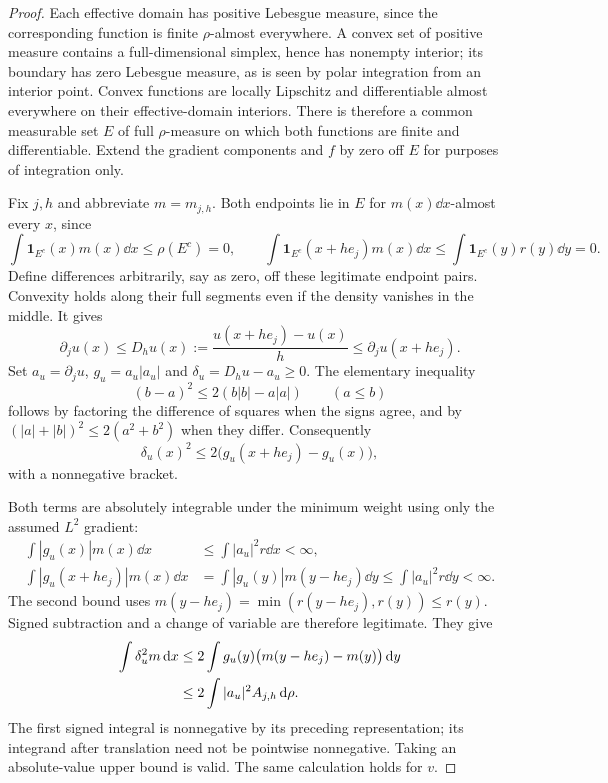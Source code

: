 \documentclass[11pt]{article}
\numberwithin{equation}{section}
\theoremstyle{remark}\newtheorem{remark}[theorem]{Remark}
\newcommand{\ind}{\mathbf 1}\newcommand{\norm}[1]{\left\lVert#1\right\rVert}
\begin{document}
\begin{proof}
Each effective domain has positive Lebesgue measure, since the corresponding function is finite $\rho$-almost everywhere. A convex set of positive measure contains a full-dimensional simplex, hence has nonempty interior; its boundary has zero Lebesgue measure, as is seen by polar integration from an interior point. Convex functions are locally Lipschitz and differentiable almost everywhere on their effective-domain interiors. There is therefore a common measurable set $E$ of full $\rho$-measure on which both functions are finite and differentiable. Extend the gradient components and $f$ by zero off $E$ for purposes of integration only.

Fix $j,h$ and abbreviate $m=m_{j,h}$. Both endpoints lie in $E$ for $m(x)\dd x$-almost every $x$, since
\[
 \int\ind_{E^c}(x)m(x)\dd x\le\rho(E^c)=0,\qquad
 \int\ind_{E^c}(x+he_j)m(x)\dd x
 \le\int\ind_{E^c}(y)r(y)\dd y=0.
\]
Define differences arbitrarily, say as zero, off these legitimate endpoint pairs. Convexity holds along their full segments even if the density vanishes in the middle. It gives
\[
 \partial_j u(x)\le D_hu(x):=\frac{u(x+he_j)-u(x)}h
          \le\partial_j u(x+he_j).
\]
Set $a_u=\partial_j u$, $g_u=a_u|a_u|$ and $\delta_u=D_hu-a_u\ge0$. The elementary inequality
\begin{equation}\label{eq:signed-square}
 (b-a)^2\le2(b|b|-a|a|)\qquad(a\le b)
\end{equation}
follows by factoring the difference of squares when the signs agree, and by $(|a|+|b|)^2\le2(a^2+b^2)$ when they differ. Consequently
\[
 \delta_u(x)^2\le2\bigl(g_u(x+he_j)-g_u(x)\bigr),
\]
with a nonnegative bracket.

Both terms are absolutely integrable under the minimum weight using only the assumed $L^2$ gradient:
\begin{align*}
 \int|g_u(x)|m(x)\dd x&\le\int|a_u|^2r\dd x<\infty,\\
 \int|g_u(x+he_j)|m(x)\dd x
 &=\int|g_u(y)|m(y-he_j)\dd y\le\int|a_u|^2r\dd y<\infty.
\end{align*}
The second bound uses $m(y-he_j)=\min(r(y-he_j),r(y))\le r(y)$. Signed subtraction and a change of variable are therefore legitimate. They give
\begin{align}
 \int\delta_u^2m\,\mathrm d x
 &\le2\int g_u(y)\bigl(m(y-he_j)-m(y)\bigr)\,\mathrm d y\notag\\
 &\le2\int|a_u|^2 A_{j,h}\,\mathrm d\rho.\label{eq:minimum-error}
\end{align}
The first signed integral is nonnegative by its preceding representation; its integrand after translation need not be pointwise nonnegative. Taking an absolute-value upper bound is valid. The same calculation holds for $v$.


\end{proof}
\end{document}

